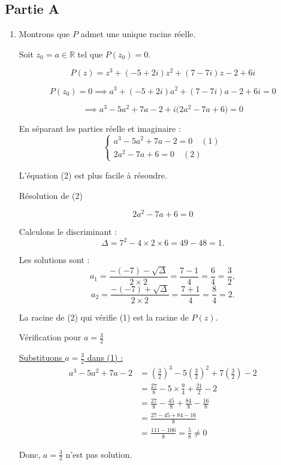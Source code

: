 \documentclass[12pt,a4paper]{article}
\begin{document}
\subsection*{ Partie A}
\begin{enumerate}
\item Montrons que $P$ admet une unique racine réelle.

Soit $z_0 = a \in \mathbb{R}$ tel que $P(z_0) = 0$.

\[
P(z) = z^3 + (-5 + 2i)z^2 + (7 - 7i)z - 2 + 6i
\]

\[
P(z_0) = 0 \implies a^3 + (-5 + 2i)a^2 + (7 - 7i)a - 2 + 6i = 0
\]

\[
\implies a^3 - 5a^2 + 7a - 2 + i\big(2a^2 - 7a + 6\big) = 0
\]

En séparant les parties réelle et imaginaire :
\[
\begin{cases}
a^3 - 5a^2 + 7a - 2 = 0 \quad (1) \\
2a^2 - 7a + 6 = 0 \quad (2)
\end{cases}
\]

L'équation (2) est plus facile à résoudre.

Résolution de (2)

\[
2a^2 - 7a + 6 = 0
\]

Calculons le discriminant :
\[
\Delta = 7^2 - 4 \times 2 \times 6 = 49 - 48 = 1.
\]

Les solutions sont :
\[
a_1 = \frac{-(-7) - \sqrt{\Delta}}{2 \times 2} = \frac{7 - 1}{4} = \frac{6}{4} = \frac{3}{2},
\]
\[
a_2 = \frac{-(-7) + \sqrt{\Delta}}{2 \times 2} = \frac{7 + 1}{4} = \frac{8}{4} = 2.
\]

La racine de (2) qui vérifie (1) est la racine de $P(z)$.

Vérification pour $a = \frac{3}{2}$

\underline{Substituons $a = \frac{3}{2}$ dans (1) :}
\begin{align*}
a^3 - 5a^2 + 7a - 2 &= \left(\frac{3}{2}\right)^3 - 5\left(\frac{3}{2}\right)^2 + 7\left(\frac{3}{2}\right) - 2\\
										&=\frac{27}{8} - 5 \times \frac{9}{4} + \frac{21}{2} - 2\\
										&=\frac{27}{8} - \frac{45}{8} + \frac{84}{8} - \frac{16}{8}\\
										&=\frac{27 - 45 + 84 - 16}{8}\\
										&= \frac{111 - 106}{8} = \frac{5}{8} \neq 0
\end{align*}

Donc, $a = \frac{3}{2}$ n'est pas solution.


\end{enumerate}
\end{document}
